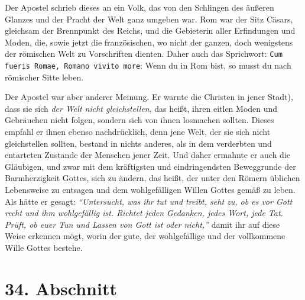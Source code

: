\medskip

Der Apostel schrieb dieses an ein Volk, das von den Schlingen des äußeren
Glanzes
und der Pracht der Welt ganz umgeben war. Rom war der Sitz
Cäsars, gleichsam
der Brennpunkt des Reichs, und die Gebieterin aller Erfindungen und Moden, die,
sowie jetzt die französischen, wo nicht der ganzen, doch wenigstens der
römischen Welt zu Vorschriften dienten. Daher auch das Sprichwort: \texttt{Cum
fueris Romae, Romano vivito more}: Wenn du in Rom bist, so
musst
du nach römischer Sitte leben.

\medskip

Der Apostel war aber anderer Meinung. Er warnte
die Christen in jener
Stadt), dass sie sich \textit{der Welt nicht gleichstellen}, das heißt, ihren
eitlen
Moden
und Gebräuchen nicht folgen, sondern sich von ihnen losmachen sollten.
Dieses empfahl er ihnen ebenso nachdrücklich, denn jene Welt, der sie sich
nicht gleichstellen sollten, bestand in nichts anderes, als in dem verderbten
und
entarteten Zustande der Menschen jener Zeit. Und daher ermahnte er auch die
Gläubigen, und zwar mit dem kräftigsten und eindringendsten Beweggrunde der
Barmherzigkeit Gottes, sich zu ändern, das heißt, der unter den Römern üblichen
Lebensweise zu entsagen und dem wohlgefälligen Willen Gottes gemäß zu leben.
Als hätte er gesagt:
\textit{"`Untersucht, was ihr tut und treibt, seht zu, ob es vor
Gott recht und ihm wohlgefällig ist. Richtet jeden Gedanken, jedes Wort, jede
Tat. Prüft, ob euer Tun und Lassen von Gott ist oder nicht,"'}
damit ihr auf diese Weise erkennen mögt, worin der gute, der
wohlgefällige und der vollkommene Wille Gottes bestehe.

\section{34. Abschnitt} \label{kap9_ab34}

